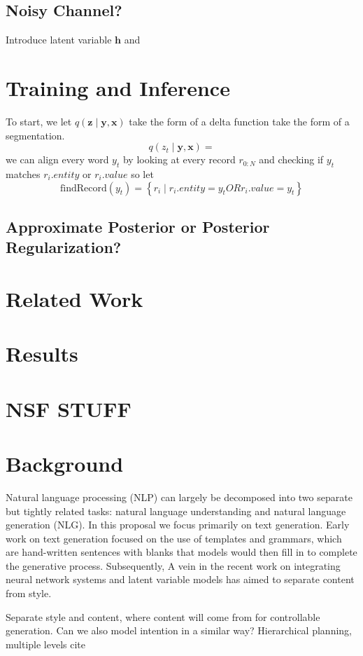 \documentclass{article}
\newcommand\set[1]{\left\{#1\right\}}
\newcommand{\bh}{\mathbf{h}}
\newcommand{\bx}{\mathbf{x}}
\newcommand{\by}{\mathbf{y}}
\newcommand{\bz}{\mathbf{z}}
\begin{document}
\subsection{Noisy Channel?}
Introduce latent variable $\bh$ and 

\section{Training and Inference}
To start, we let $q(\bz\mid\by,\bx)$ take the form of a
delta function take the form of a segmentation.
$$q(z_t\mid\by,\bx)=$$
we can align every word $y_t$ by looking at every record $r_{0:N}$ and checking if $y_t$ matches $r_i.entity$ or $r_i.value$
so let
$$\textrm{findRecord}(y_t) = \set{ r_i \mid r_i.entity = y_t OR r_i.value = y_t }$$
\subsection{Approximate Posterior or Posterior Regularization?}

\section{Related Work}

\section{Results}

\section{NSF STUFF}
\section{Background}
Natural language processing (NLP) can largely be decomposed into two separate but
tightly related tasks: natural language understanding and natural language generation (NLG).
In this proposal we focus primarily on text generation.
Early work on text generation focused on the use of templates and grammars, 
which are hand-written sentences with blanks that models would then
fill in to complete the generative process.
Subsequently, 
A vein in the recent work on integrating neural network systems and latent variable models
has aimed to separate content from style.

Separate style and content, where content will come from for controllable generation.
Can we also model intention in a similar way?
Hierarchical planning, multiple levels
cite 
\end{document}
